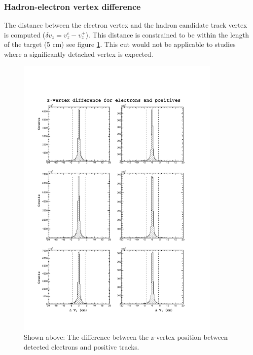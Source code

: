 \subsubsection{Hadron-electron vertex difference}
The distance between the electron vertex and the hadron candidate track vertex is computed ($\delta v_{z} = v_{z}^{e} - v_{z}^{+}$).  This distance is constrained to be within the length of the target (5 cm) see figure \ref{fig:dvz}.  This cut would not be applicable to studies where a significantly detached vertex is expected.  

\begin{figure}
  \label{fig:dvz}
  \begin{center}
    \includegraphics[width=10cm]{image/plots/hadron-id/dvz.pdf}
    \caption{Shown above: The difference between the z-vertex position between detected electrons and positive tracks.}
  \end{center}
\end{figure}


%
%


